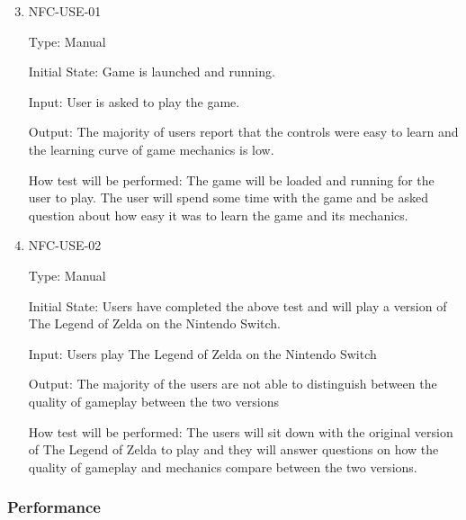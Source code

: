 \documentclass[12pt, titlepage]{article}
\begin{document}
\begin{enumerate}
	\setcounter{enumi}{2}	
	
	\item{NFC-USE-01\\}
	
	Type: Manual
	
	Initial State: Game is launched and running.
	
	Input: User is asked to play the game.
	
	Output: The majority of users report that the controls were easy to learn and the learning curve of game mechanics is low.
	
	How test will be performed: The game will be loaded and running for the user to play. The user will spend some time with the game and be asked question about how easy it was to learn the game and its mechanics.
	
	\item{NFC-USE-02\\}
	
	Type: Manual
	
	Initial State: Users have completed the above test and will play a version of The Legend of Zelda on the Nintendo Switch.
	
	Input: Users play The Legend of Zelda on the Nintendo Switch
	
	Output: The majority of the users are not able to distinguish between the quality of gameplay between the two versions
	
	How test will be performed: The users will sit down with the original version of The Legend of Zelda to play and they will answer questions on how the quality of gameplay and mechanics compare between the two versions.
	
\end{enumerate}

\subsubsection{Performance}
\end{document}
